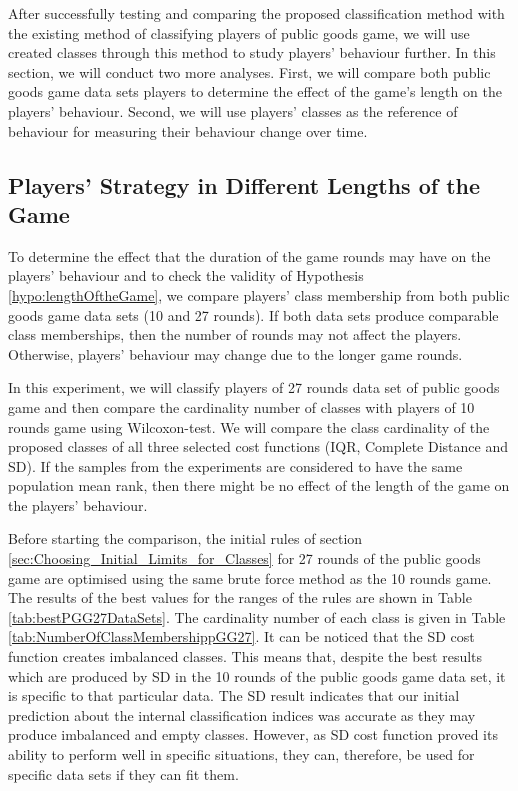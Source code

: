 After successfully testing and comparing the proposed classification method with the existing method of classifying players of public goods game, we will use created classes through this method to study players' behaviour further. In this section, we will conduct two more analyses. First, we will compare both public goods game data sets players to determine the effect of the game's length on the players' behaviour. Second, we will use players' classes as the reference of behaviour for measuring their behaviour change over time.

\subsection{Players' Strategy in Different Lengths of the Game}
To determine the effect that the duration of the game rounds may have on the players' behaviour and to check the validity of Hypothesis \ref{hypo:lengthOftheGame}, we compare players' class membership from both public goods game data sets (10 and 27 rounds). If both data sets produce comparable class memberships, then the number of rounds may not affect the players. Otherwise, players' behaviour may change due to the longer game rounds. 

In this experiment, we will classify players of 27 rounds data set of public goods game and then compare the cardinality number of classes with players of 10 rounds game using Wilcoxon-test. We will compare the class cardinality of the proposed classes of all three selected cost functions (IQR, Complete Distance and SD). If the samples from the experiments are considered to have the same population mean rank, then there might be no effect of the length of the game on the players' behaviour.

Before starting the comparison, the initial rules of section \ref{sec:Choosing_Initial_Limits_for_Classes} for 27 rounds of the public goods game are optimised using the same brute force method as the 10 rounds game. The results of the best values for the ranges of the rules are shown in Table \ref{tab:bestPGG27DataSets}. The cardinality number of each class is given in Table \ref{tab:NumberOfClassMembershippGG27}. It can be noticed that the SD cost function creates imbalanced classes. This means that, despite the best results which are produced by SD in the 10 rounds of the public goods game data set, it is specific to that particular data. The SD result indicates that our initial prediction about the internal classification indices was accurate as they may produce imbalanced and empty classes. However, as SD cost function proved its ability to perform well in specific situations, they can, therefore, be used for specific data sets if they can fit them.


